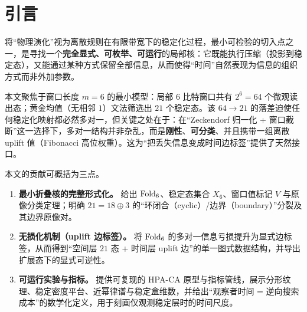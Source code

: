 
\section{引言}

将“物理演化”视为离散规则在有限带宽下的稳定化过程，最小可检验的切入点之一，是寻找一个\textbf{完全显式、可枚举、可运行}的局部核：它既能执行压缩（投影到稳定态），又能通过某种方式保留全部信息，从而使得“时间”自然表现为信息的组织方式而非外加参数。

本文聚焦于窗口长度 $m=6$ 的最小模型：局部 $6$ 比特窗口共有 $2^6=64$ 个微观读出态；黄金均值（无相邻 $1$）文法筛选出 $21$ 个稳定态。该 $64\to 21$ 的落差迫使任何稳定化映射都必然多对一，但关键之处在于：在“Zeckendorf 归一化 + 窗口截断”这一选择下，多对一结构并非杂乱，而是\textbf{刚性}、\textbf{可分类}、并且携带一组离散 uplift 值（Fibonacci 高位权重）。这为“把丢失信息变成时间边标签”提供了天然接口。

本文的贡献可概括为三点。
\begin{enumerate}
  \item \textbf{最小折叠核的完整形式化。} 给出 $\mathrm{Fold}_6$、稳定态集合 $X_6$、窗口值标记 $V$ 与原像分类定理；明确 $21=18\oplus 3$ 的“环闭合（cyclic）/边界（boundary）”分裂及其边界原像对。
  \item \textbf{无损化机制（uplift 边标签）。} 将 $\mathrm{Fold}_6$ 的多对一信息亏损提升为显式边标签，从而得到“空间层 $21$ 态 + 时间层 uplift 边”的单一图式数据结构，并导出扩展态下的显式可逆性。
  \item \textbf{可运行实验与指标。} 提供可复现的 HPA-CA 原型与指标管线，展示分形纹理、稳定密度平台、近幂律谱与稳定盒维数，并给出“观察者时间 = 逆向搜索成本”的数学化定义，用于刻画仅观测稳定层时的时间尺度。
\end{enumerate}

